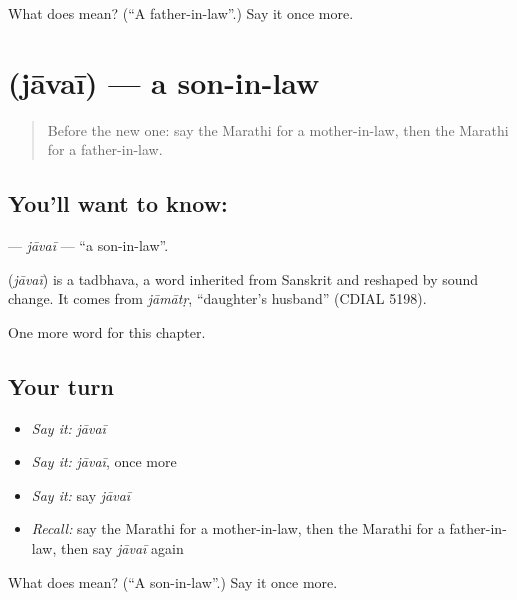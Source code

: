 \begin{tcolorbox}[breakable,colback=teal!4,colframe=teal!35!black,title={Before you move on}]
What does  mean? (\textquotedblleft{}A father-in-law\textquotedblright{}.) Say it once more.
\end{tcolorbox}
\section[\texorpdfstring{\mr{जावई} (jāvaī)}{जावई (jāvaī)}]{ (jāvaī) — a son-in-law}

\label{lesson:MR-C264-javai}



\begin{quote}
Before the new one: say the Marathi for a mother-in-law, then the Marathi for a father-in-law.
\end{quote}

\subsection*{You'll want to know: }
\textbf{} — \emph{jāvaī} — \textquotedblleft{}a son-in-law\textquotedblright{}.

\begin{cousinweb}
\textbf{} (\emph{jāvaī}) is a tadbhava, a word inherited from Sanskrit and reshaped by sound change. It comes from \emph{jāmātṛ}, \textquotedblleft{}daughter's husband\textquotedblright{} (CDIAL 5198).
\end{cousinweb}

\begin{grammarlens}[title={What you've built}]
One more word for this chapter.
\end{grammarlens}

\subsection*{Your turn}
\begin{itemize}
\raggedright
  \item \emph{Say it:} \emph{jāvaī}
  \item \emph{Say it:} \emph{jāvaī}, once more
  \item \emph{Say it:} say \emph{jāvaī}
  \item \emph{Recall:} say the Marathi for a mother-in-law, then the Marathi for a father-in-law, then say \emph{jāvaī} again
\end{itemize}

\begin{tcolorbox}[breakable,colback=teal!4,colframe=teal!35!black,title={Before you move on}]
What does  mean? (\textquotedblleft{}A son-in-law\textquotedblright{}.) Say it once more.
\end{tcolorbox}
